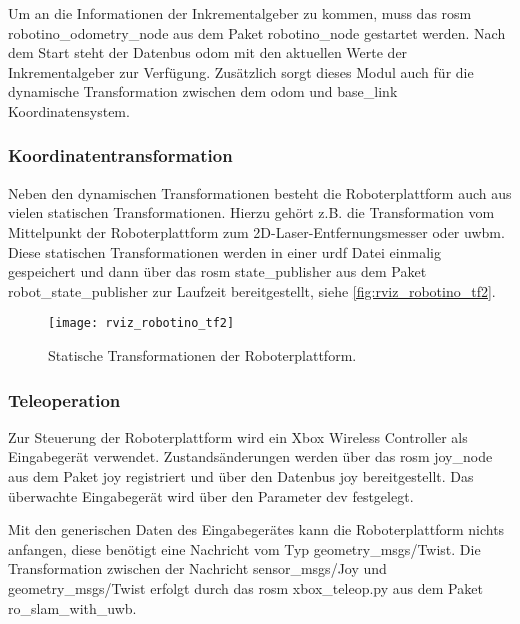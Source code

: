 Um an die Informationen der Inkrementalgeber zu kommen, muss das \Gls{rosm} robotino\_odometry\_node aus dem Paket robotino\_node gestartet werden. Nach dem Start steht der Datenbus odom mit den aktuellen Werte der Inkrementalgeber zur Verfügung. Zusätzlich sorgt dieses Modul auch für die dynamische Transformation zwischen dem odom und base\_link Koordinatensystem.


%
%
\subsubsection{Koordinatentransformation}

Neben den dynamischen Transformationen besteht die Roboterplattform auch aus vielen statischen Transformationen. Hierzu gehört z.B. die Transformation vom Mittelpunkt der Roboterplattform zum 2D-Laser-Entfernungsmesser oder \Gls{uwbm}. Diese statischen Transformationen werden in einer \Gls{urdf} Datei einmalig gespeichert und dann über das \Gls{rosm} state\_publisher aus dem Paket robot\_state\_publisher zur Laufzeit bereitgestellt, siehe \autoref{fig:rviz_robotino_tf2}.

\begin{figure}
	\centering
	\texttt{[image: rviz\_robotino\_tf2]}
	\caption{Statische Transformationen der Roboterplattform.}
	\label{fig:rviz_robotino_tf2}
\end{figure}


%
%
\subsubsection{Teleoperation}

Zur Steuerung der Roboterplattform wird ein Xbox Wireless Controller als Eingabegerät verwendet. Zustandsänderungen werden über das \Gls{rosm} joy\_node aus dem Paket joy registriert und über den Datenbus joy bereitgestellt. Das überwachte Eingabegerät wird über den Parameter dev festgelegt.

Mit den generischen Daten des Eingabegerätes kann die Roboterplattform nichts anfangen, diese benötigt eine Nachricht vom Typ geometry\_msgs/Twist. Die Transformation zwischen der Nachricht sensor\_msgs/Joy und geometry\_msgs/Twist erfolgt durch das \Gls{rosm} xbox\_teleop.py aus dem Paket ro\_slam\_with\_uwb.


